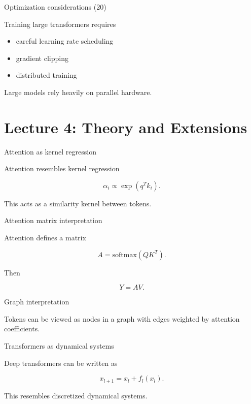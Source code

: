 \documentclass[aspectratio=169]{beamer}
\begin{document}
\begin{frame}{Optimization considerations (20)}

Training large transformers requires

\begin{itemize}
\item careful learning rate scheduling
\item gradient clipping
\item distributed training
\end{itemize}

Large models rely heavily on parallel hardware.

\end{frame}


\section{Lecture 4: Theory and Extensions}


\begin{frame}{Attention as kernel regression}

Attention resembles kernel regression

\[
\alpha_i \propto \exp(q^T k_i).
\]

This acts as a similarity kernel between tokens.

\end{frame}


\begin{frame}{Attention matrix interpretation}

Attention defines a matrix

\[
A = \text{softmax}(QK^T).
\]

Then

\[
Y = AV.
\]

\end{frame}


\begin{frame}{Graph interpretation}

Tokens can be viewed as nodes in a graph
with edges weighted by attention coefficients.

\end{frame}


\begin{frame}{Transformers as dynamical systems}

Deep transformers can be written as

\[
x_{l+1} = x_l + f_l(x_l).
\]

This resembles discretized dynamical systems.

\end{frame}
\end{document}
